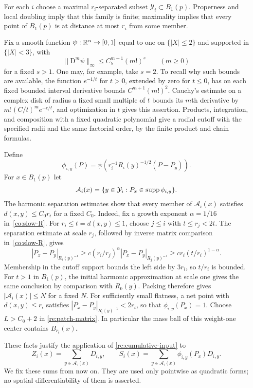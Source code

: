For each $i$ choose a maximal $r_i$-separated subset
$\mathcal Y_i\subset B_1(p)$.  Properness and local doubling imply
that this family is finite; maximality implies that every point of
$B_1(p)$ is at distance at most $r_i$ from some member.

Fix a smooth function $\psi:\mathbb R^n\to[0,1]$ equal to one on
$\{|X|\le2\}$ and supported in $\{|X|<3\}$, with
\begin{equation}
 \label{re:bump-jets}
 \|\mathrm D^m\psi\|_{\infty}
       \le C_b^{m+1}(m!)^s\qquad(m\ge0)
\end{equation}
for a fixed $s>1$.  One may, for example, take $s=2$.  To recall why
such bounds are available, the function $e^{-1/t}$ for $t>0$, extended
by zero for $t\le0$, has on each fixed bounded interval derivative
bounds $C^{m+1}(m!)^2$.  Cauchy's estimate on a complex disk of radius
a fixed small multiple of $t$ bounds its $m$th derivative by
$m!(C/t)^m e^{-c/t}$, and optimization in $t$ gives this assertion.
Products, integration, and composition with a fixed quadratic polynomial
give a radial cutoff with the specified radii and the same factorial
order, by the finite product and chain formulas.

Define
\[
 \phi_{i,y}(P)=
 \psi\left(r_i^{-1}R_i(y)^{-1/2}(P-P_y)\right).
\]
For $x\in B_1(p)$ let
\[
 \mathcal A_i(x)=\{y\in\mathcal Y_i:P_x\in\operatorname{supp}\phi_{i,y}\}.
\]
The harmonic separation estimates show that every member of
$\mathcal A_i(x)$ satisfies $d(x,y)\le C_0r_i$ for a fixed $C_0$.
Indeed, fix a growth exponent $\alpha=1/16$ in~\eqref{co:slow-R}.
For $r_i\le t=d(x,y)\le1$, choose $j\le i$ with $t\le r_j<2t$.
The separation estimate at scale $r_j$, followed by inverse matrix
comparison in~\eqref{co:slow-R}, gives
\[
 |P_x-P_y|_{R_i(y)^{-1}}
 \ge c(r_i/r_j)^\alpha |P_x-P_y|_{R_j(y)^{-1}}
 \ge c r_i(t/r_i)^{1-\alpha}.
\]
Membership in the cutoff support bounds the left side by $3r_i$, so
$t/r_i$ is bounded. For $t>1$ in $B_1(p)$, the initial harmonic
approximation at scale one gives the same conclusion by comparison
with $R_0(y)$. Packing
therefore gives $|\mathcal A_i(x)|\le N$ for a fixed $N$.
For sufficiently small flatness, a net point with $d(x,y)\le r_i$
satisfies $|P_x-P_y|_{R_i(y)^{-1}}<2r_i$, so that
$\phi_{i,y}(P_x)=1$.  Choose $L>C_0+2$ in
\eqref{re:patch-matrix}.  In particular the mass ball of this
weight-one center contains $B_{r_i}(x)$.

These facts justify the application of
\eqref{re:cumulative-input} to
\begin{equation}
 \label{re:active-sums}
 Z_i(x)=\sum_{y\in\mathcal A_i(x)}D_{i,y},\qquad
 S_i(x)=\sum_{y\in\mathcal A_i(x)}
                     \phi_{i,y}(P_x)D_{i,y}.
\end{equation}
We fix these sums from now on.  They are used only pointwise as
quadratic forms; no spatial differentiability of them is asserted.

